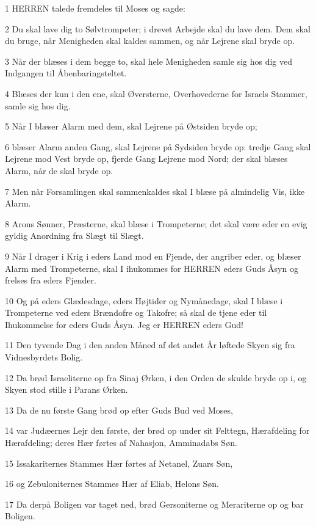 \par 1 HERREN talede fremdeles til Moses og sagde:
\par 2 Du skal lave dig to Sølvtrompeter; i drevet Arbejde skal du lave dem. Dem skal du bruge, når Menigheden skal kaldes sammen, og når Lejrene skal bryde op.
\par 3 Når der blæses i dem begge to, skal hele Menigheden samle sig hos dig ved Indgangen til Åbenbaringsteltet.
\par 4 Blæses der kun i den ene, skal Øversterne, Overhovederne for Israels Stammer, samle sig hos dig.
\par 5 Når I blæser Alarm med dem, skal Lejrene på Østsiden bryde op;
\par 6 blæser Alarm anden Gang, skal Lejrene på Sydsiden bryde op: tredje Gang skal Lejrene mod Vest bryde op, fjerde Gang Lejrene mod Nord; der skal blæses Alarm, når de skal bryde op.
\par 7 Men når Forsamlingen skal sammenkaldes skal I blæse på almindelig Vis, ikke Alarm.
\par 8 Arons Sønner, Præsterne, skal blæse i Trompeterne; det skal være eder en evig gyldig Anordning fra Slægt til Slægt.
\par 9 Når I drager i Krig i eders Land mod en Fjende, der angriber eder, og blæser Alarm med Trompeterne, skal I ihukommes for HERREN eders Guds Åsyn og frelses fra eders Fjender.
\par 10 Og på eders Glædesdage, eders Højtider og Nymånedage, skal I blæse i Trompeterne ved eders Brændofre og Takofre; så skal de tjene eder til Ihukommelse for eders Guds Åsyn. Jeg er HERREN eders Gud!
\par 11 Den tyvende Dag i den anden Måned af det andet År løftede Skyen sig fra Vidnesbyrdets Bolig.
\par 12 Da brød Israeliterne op fra Sinaj Ørken, i den Orden de skulde bryde op i, og Skyen stod stille i Parans Ørken.
\par 13 Da de nu første Gang brød op efter Guds Bud ved Moses,
\par 14 var Judæernes Lejr den første, der brød op under sit Felttegn, Hærafdeling for Hærafdeling; deres Hær førtes af Nahasjon, Amminadabs Søn.
\par 15 Issakariternes Stammes Hær førtes af Netanel, Zuars Søn,
\par 16 og Zebuloniternes Stammes Hær af Eliab, Helons Søn.
\par 17 Da derpå Boligen var taget ned, brød Gersoniterne og Merariterne op og bar Boligen.
